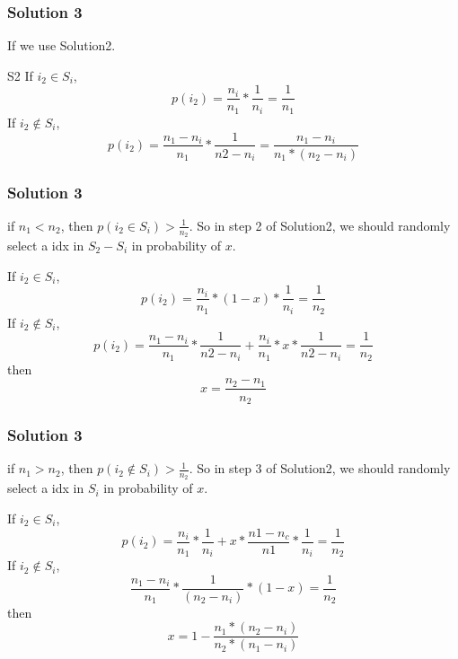 \documentclass[notheorems, aspectratio=54]{beamer}
\begin{document}
\begin{frame}
    \frametitle{Solution 3}
    If we use Solution2.
    \begin{block}{S2}
        If $i_2 \in S_i$, 
        $$
            p(i_2) = \frac{n_i}{n_1}*\frac{1}{n_i} = \frac{1}{n_1}
        $$
        If $i_2 \notin S_i$, 
        $$
            p(i_2) = \frac{n_1-n_i}{n_1}*\frac{1}{n2-n_i} = \frac{n_1-n_i}{n_1*(n_2-n_i)}
        $$
    \end{block}
\end{frame}

\begin{frame}
    \frametitle{Solution 3}
        if $n_1 < n_2$, then $p(i_2 \in S_i) > \frac{1}{n_2}$. So in step 2 of Solution2, we should randomly select a idx in $S_2-S_i$ in probability of $x$.\\
        \begin{block}
        If $i_2 \in S_i$, 
        $$
            p(i_2) = \frac{n_i}{n_1}*(1-x)*\frac{1}{n_i} = \frac{1}{n_2}
        $$
        If $i_2 \notin S_i$, 
        $$
            p(i_2) = \frac{n_1-n_i}{n_1}*\frac{1}{n2-n_i} + \frac{n_i}{n_1}*x*\frac{1}{n2-n_i} = \frac{1}{n_2}
        $$
        then
        $$
            x = \frac{n_2-n_1}{n_2}
        $$
    \end{block}
\end{frame}

\begin{frame}
    \frametitle{Solution 3}
        if $n_1 > n_2$, then $p(i_2 \notin S_i) > \frac{1}{n_2}$. So in step 3 of Solution2, we should randomly select a idx in $S_i$ in probability of $x$.\\
        \begin{block}
        If $i_2 \in S_i$, 
        $$
            p(i_2) = \frac{n_i}{n_1}*\frac{1}{n_i}+x*\frac{n1-n_c}{n1}*\frac{1}{n_i} = \frac{1}{n_2}
        $$
        If $i_2 \notin S_i$, 
        $$
        \frac{n_1-n_i}{n_1}*\frac{1}{(n_2-n_i)}*(1-x) = \frac{1}{n_2}
        $$
        then
        $$
            x = 1-\frac{n_1*(n_2-n_i)}{n_2*(n_1-n_i)}
        $$
    \end{block}
\end{frame}
\end{document}
